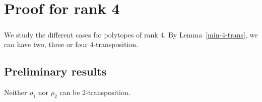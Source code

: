 \chapter{Proof for rank 4}
\label{proof-4}

\paragraph{}
We study the different cases for polytopes of rank 4. By Lemma~\ref{min-4-trans}, we can have two, three or four 4-transposition.

\section{Preliminary results}

\begin{theorem}
  Neither $\rho_1$ nor $\rho_2$ can be 2-transposition.
\end{theorem}


